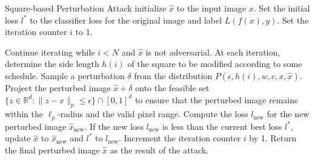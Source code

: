 Square-based Perturbation Attack initialize $\hat{x}$ to the input image $x$. Set the initial loss $l^*$ to the classifier loss for the original image and label $L(f(x), y)$. Set the iteration counter $i$ to 1.

Continue iterating while $i < N$ and $\hat{x}$ is not adversarial. At each iteration, determine the side length $h(i)$ of the square to be modified according to some schedule. Sample a perturbation $\delta$ from the distribution $P(\epsilon, h(i), w, c, x, \hat{x})$. Project the perturbed image $\hat{x} + \delta$ onto the feasible set $\{z \in \mathbb{R}^d : \|z - x\|_p \leq \epsilon\} \cap [0, 1]^d$ to ensure that the perturbed image remains within the $\ell_p$-radius and the valid pixel range. Compute the loss $l_{\text{new}}$ for the new perturbed image $\hat{x}_{\text{new}}$. If the new loss $l_{\text{new}}$ is less than the current best loss $l^*$, update $\hat{x}$ to $\hat{x}_{\text{new}}$ and $l^*$ to $l_{\text{new}}$. Increment the iteration counter $i$ by 1.
Return the final perturbed image $\hat{x}$ as the result of the attack.
